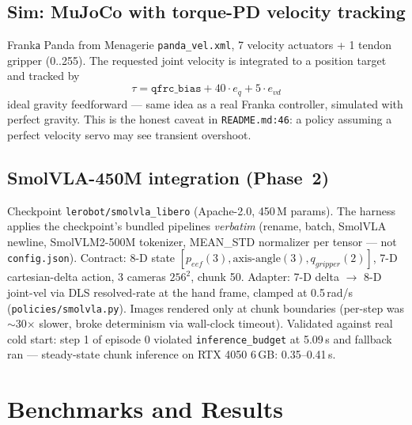 \documentclass[11pt,a4paper]{article}
\begin{document}
\subsection{Sim: MuJoCo with torque-PD velocity tracking}
Frankа Panda from Menagerie \texttt{panda\_vel.xml}, 7 velocity actuators + 1 tendon gripper (0..255). The requested joint velocity is integrated to a position target and tracked by
\[
\tau = \texttt{qfrc\_bias} + 40 \cdot e_q + 5 \cdot e_{vd}
\]
ideal gravity feedforward — same idea as a real Franka controller, simulated with perfect gravity. This is the honest caveat in \texttt{README.md:46}: a policy assuming a perfect velocity servo may see transient overshoot.

\subsection{SmolVLA-450M integration (Phase~2)}
Checkpoint \texttt{lerobot/smolvla\_libero} (Apache-2.0, 450\,M params). The harness applies the checkpoint's bundled pipelines \textit{verbatim} (rename, batch, SmolVLA newline, SmolVLM2-500M tokenizer, MEAN\_STD normalizer per tensor — not \texttt{config.json}). Contract: 8-D state $[p_{eef}(3), \text{axis-angle}(3), q_{gripper}(2)]$, 7-D cartesian-delta action, 3 cameras $256^2$, chunk 50. Adapter: 7-D delta $\rightarrow$ 8-D joint-vel via DLS resolved-rate at the hand frame, clamped at 0.5\,rad/s (\texttt{policies/smolvla.py}). Images rendered only at chunk boundaries (per-step was $\sim$30$\times$ slower, broke determinism via wall-clock timeout). Validated against real cold start: step 1 of episode 0 violated \texttt{inference\_budget} at 5.09\,s and fallback ran — steady-state chunk inference on RTX 4050 6\,GB: 0.35--0.41\,s.

\section{Benchmarks and Results}
\label{sec:bench}
\end{document}
